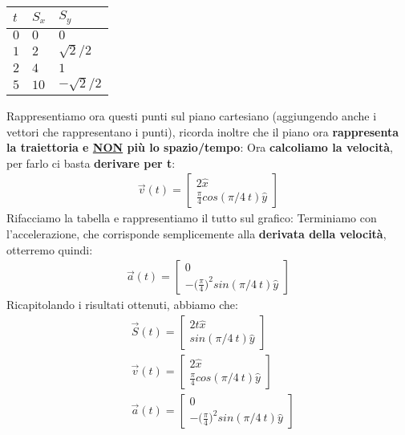 				\begin{center}
					\begin{tabularx}{0.5\textwidth}{
						| >{\centering\arraybackslash}X
						| >{\centering\arraybackslash}X
						| >{\centering\arraybackslash}X | }
						\hline
						$t$ & $S_x$ & $S_y$\\
						\hline
						\hline
						$0$ & $0$ & $0$ \\
						$1$ & $2$ & $\sqrt{2}/2$ \\
						$2$ & $4$ & $1$ \\
						$5$ & $10$ & $-\sqrt{2}/2$ \\
						\hline
					\end{tabularx}
				\end{center}
				Rappresentiamo ora questi punti sul piano cartesiano (aggiungendo anche i vettori che rappresentano i punti), ricorda inoltre che il piano ora \textbf{rappresenta la traiettoria e \underline{NON} più lo spazio/tempo}:
				Ora \textbf{calcoliamo la velocità}, per farlo ci basta \textbf{derivare per t}:
				\begin{align*}
					\vec{v}(t) =
					\begin{bmatrix}
						2\hat{x}\\
						\frac{\pi}{4}cos(\pi/4\ t)\hat{y}
					\end{bmatrix}
				\end{align*}
				Rifacciamo la tabella e rappresentiamo il tutto sul grafico:
				Terminiamo con l'accelerazione, che corrisponde semplicemente alla \textbf{derivata della velocità}, otterremo quindi:
				\begin{align*}
					\vec{a}(t) =
					\begin{bmatrix}
						0\\
						-\big(\frac{\pi}{4}\big)^2sin(\pi/4\ t)\hat{y}
					\end{bmatrix}
				\end{align*}
				Ricapitolando i risultati ottenuti, abbiamo che:
				\begin{align*}
					&\vec{S}(t) =
					\begin{bmatrix}
						2t\hat{x}\\
						sin(\pi/4\ t)\hat{y}
					\end{bmatrix}\\
					&\vec{v}(t) =
					\begin{bmatrix}
						2\hat{x}\\
						\frac{\pi}{4}cos(\pi/4\ t)\hat{y}
					\end{bmatrix}\\
					&\vec{a}(t) =
					\begin{bmatrix}
						0\\
						-\big(\frac{\pi}{4}\big)^2sin(\pi/4\ t)\hat{y}
					\end{bmatrix}
				\end{align*}
